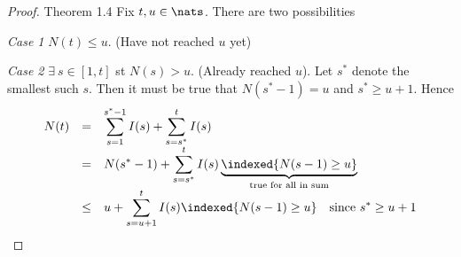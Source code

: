 \documentclass[11pt,a4paper]{article}
\begin{document}
\begin{proof}{Theorem 1.4}
  Fix $t,u\in\nats$. There are two possibilities
  \par\textit{Case 1} $N(t)\leq u$. (Have not reached $u$ yet)

  \par\textit{Case 2} $\exists\ s\in[1,t]$ st $N(s)>u$. (Already reached $u$). Let $s^*$ denote the smallest such $s$. Then it must be true that $N(s^*-1)=u$ and $s^*\geq u+1$. Hence
  \[\begin{array}{rcl}
    N(t)&=&\displaystyle\sum_{s=1}^{s^*-1}I(s)+\sum_{s=s^*}^tI(s)\\
    &=&\displaystyle N(s^*-1)+\sum_{s=s^*}^tI(s)\underbrace{\indexed\{N(s-1)\geq u\}}_{\tiny\text{true for all in sum}}\\
    &\leq&\displaystyle u+\sum_{s=u+1}^tI(s)\indexed\{N(s-1)\geq u\}\quad\text{since }s^*\geq u+1
  \end{array}\]
  \proved
\end{proof}
\end{document}
